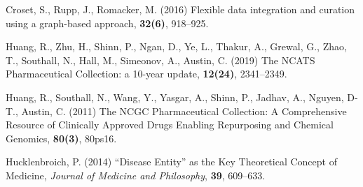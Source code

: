 \documentclass{bioinfo}
\begin{document}
\begin{thebibliography}{}
Croset, S., Rupp, J., Romacker, M. (2016) Flexible data integration and curation using a graph-based approach, \textbf{32(6)}, 918--925.

Huang, R., Zhu, H., Shinn, P., Ngan, D., Ye, L., Thakur, A.,
Grewal, G., Zhao, T., Southall, N., Hall, M., Simeonov, A., Austin, C. (2019) The NCATS Pharmaceutical Collection: a 10-year update, \textbf{12(24)}, 2341--2349.

Huang, R., Southall, N., Wang, Y., Yasgar, A., Shinn, P.,
Jadhav, A., Nguyen, D-T., Austin, C. (2011) The NCGC Pharmaceutical Collection:
A Comprehensive Resource of Clinically Approved Drugs Enabling Repurposing and Chemical Genomics, \textbf{80(3)}, 80ps16.

Hucklenbroich, P. (2014) ``Disease Entity'' as the Key Theoretical Concept of Medicine, \emph{Journal of Medicine and Philosophy}, \textbf{39}, 609--633.








\end{thebibliography}
\end{document}
